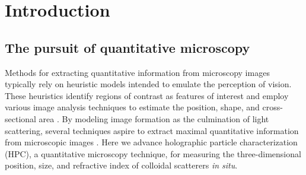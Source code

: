 \chapter{Introduction}
\label{ch:intro}









\section{The pursuit of quantitative microscopy}

Methods for extracting quantitative information from microscopy
images typically rely on heuristic models intended to emulate
the perception of vision.
These heuristics identify regions of contrast as features
of interest and employ various image analysis techniques to estimate
the position, shape, and cross-sectional area \cite{jahne97,}.
By modeling image formation as the culmination of light scattering,
several techniques aspire to extract maximal quantitative information
from microscopic images \cite{lee07,bierbaum2017}.
Here we advance holographic particle characterization (HPC),
a quantitative microscopy technique, for measuring
the three-dimensional position, size, and refractive index of
colloidal scatterers \emph{in situ}.

